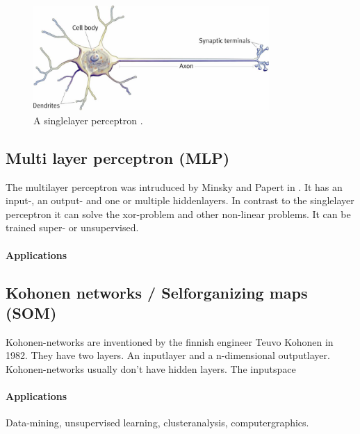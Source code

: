 \documentclass[10pt,a4paper,DIV=11]{scrreprt}
\begin{document}
\begin{center}
	\begin{figure}[H]
		\centering
		\includegraphics[width=0.8\textwidth,scale=1]{files/neuron.jpg}  
		\caption{A singlelayer perceptron \cite{PERSIN}.}
		\label{fig:neuron}
	\end{figure}
\end{center}


\subsection{Multi layer perceptron (MLP)} \label{sec:mlp}
The multilayer perceptron was intruduced by Minsky and Papert in . It has an input-, an output- and
one or multiple hiddenlayers. In contrast to the singlelayer perceptron it can solve the xor-problem and other non-linear problems. It can be trained super- or unsupervised.

\paragraph{Applications}


\subsection{Kohonen networks / Selforganizing maps (SOM)}
Kohonen-networks are inventioned by the finnish engineer Teuvo Kohonen in 1982. They have two layers. An inputlayer and a n-dimensional outputlayer.
Kohonen-networks usually don't have hidden layers.
The inputspace 

\paragraph{Applications}
Data-mining, unsupervised learning, clusteranalysis, computergraphics. 


\end{document}

